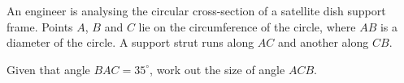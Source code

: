 \begin{question}
\noindent An engineer is analysing the circular cross-section of a satellite dish support frame. Points $A$, $B$ and $C$ lie on the circumference of the circle, where $AB$ is a diameter of the circle. A support strut runs along $AC$ and another along $CB$.

\begin{center}
\end{center}

\noindent Given that angle $BAC = 35^\circ$, work out the size of angle $ACB$.

\vspace{4cm}

\begin{flushright}
\end{flushright}
\end{question}
